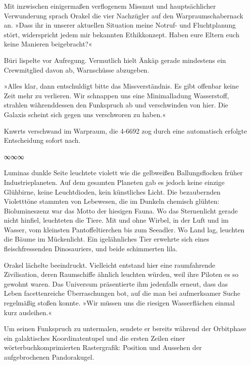 Mit inzwischen einigermaßen verflogenem Missmut und hauptsächlicher Verwunderung sprach Orakel die vier Nachzügler auf den Warpraumschabernack an. »Dass ihr in unserer aktuellen Situation meine Notruf- und Fluchtplanung stört, widerspricht jedem mir bekannten Ethikkonzept. Haben eure Eltern euch keine Manieren beigebracht?«

Büri lispelte vor Aufregung.  Vermutlich hielt Änkäp gerade mindestens ein Crewmitglied davon ab, Warnschüsse abzugeben.

»Alles klar, dann entschuldigt bitte das Missverständnis. Es gibt offenbar keine Zeit mehr zu verlieren. Wir schnappen uns eine Minimalladung Wasserstoff, strahlen währenddessen den Funkspruch ab und verschwinden von hier. Die Galaxis scheint sich gegen uns verschworen zu haben.«

 Knwrts verschwand im Warpraum, die 4-6692 zog durch eine automatisch erfolgte Entscheidung sofort nach.

\begin{center}
∞∞∞
\end{center}

Luminas dunkle Seite leuchtete violett wie die gelbweißen Ballungsflocken früher Industrieplaneten. Auf dem gesamten Planeten gab es jedoch keine einzige Glühbirne, keine Leuchtdioden, kein künstliches Licht. Die bezaubernden Violetttöne stammten von Lebewesen, die im Dunkeln chemisch glühten: Biolumineszenz war das Motto der hiesigen Fauna. Wo das Sternenlicht gerade nicht hinfiel, leuchteten die Tiere. Mit und ohne Wirbel, in der Luft und im Wasser, vom kleinsten Pantoffeltierchen bis zum Seeadler. Wo Land lag, leuchten die Bäume im Mückenlicht. Ein igelähnliches Tier erwehrte sich eines fleischfressenden Dinosauriers, und beide schimmerten lila.

Orakel lächelte beeindruckt. Vielleicht entstand hier eine raumfahrende Zivilisation, deren Raumschiffe ähnlich leuchten würden, weil ihre Piloten es so gewohnt waren. Das Universum präsentierte ihm jedenfalls erneut, dass das Leben facettenreiche Überraschungen bot, auf die man bei aufmerksamer Suche regelmäßig stoßen konnte. »Wir müssen uns die riesigen Wasserflächen einmal kurz ausleihen.«

Um seinen Funkspruch zu untermalen, sendete er bereits während der Orbitphase ein galaktisches Koordinatentupel und die ersten Zeilen einer wörterbuchkomprimierten Rastergrafik: Position und Aussehen der aufgebrochenen Pandorakugel.


